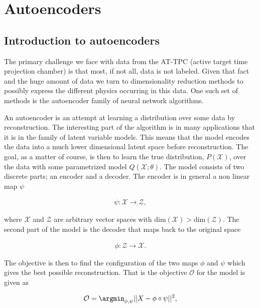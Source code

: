 
\chapter{Autoencoders}\label{sec:autoencoder}

\section{Introduction to autoencoders}\label{sec:intro_autoenc}

The primary challenge we face with data from the AT-TPC (active target time projection chamber) is that most, if not all, data is not labeled. Given that fact and the huge amount of data we turn to dimensionality reduction methods to possibly express the different physics occurring in this data. One such set of methods is the autoencoder family of neural network algorithms.

An autoencoder is an attempt at learning a distribution over some data by reconstruction. The interesting part of the algorithm is in many applications that it is in the family of latent variable models. This means that the model encodes the data into a much lower dimensional latent space before reconstruction. The goal, as a matter of course, is then to learn the true distribution, $P(\mathcal{X})$, over the data with some parametrized model $Q(\mathcal{X};\theta)$. The model consists of two discrete parts; an encoder and a decoder. The encoder is in general a non linear map $\psi$

\begin{align*}
  \psi: \mathcal{X} \rightarrow \mathcal{Z},
\end{align*}

\noindent where $\mathcal{X} $ and $\mathcal{Z}$ are arbitrary vector spaces with $\text{dim}(\mathcal{X}) > \text{dim}(\mathcal{Z})$.
The second part of the model is the decoder that maps back to the original space

\begin{align*}
  \phi: \mathcal{Z} \rightarrow \mathcal{X}.
\end{align*}

\noindent The objective is then to find the configuration of the two maps $\phi$ and $\psi$ which gives the best possible reconstruction. That is the objective $\mathcal{O}$ for the model is given as

\begin{align}\label{eq:objective_autoenc}
  \mathcal{O} = \argmin_{\phi, \psi} || X - \phi \circ \psi||^2,
\end{align}

